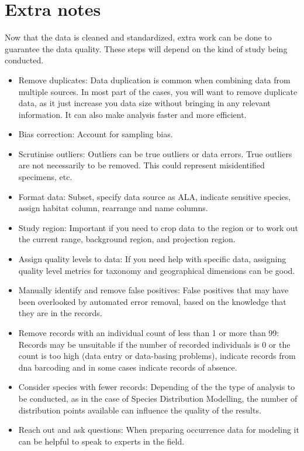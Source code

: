 \documentclass[
  letterpaper,
  DIV=11,
  numbers=noendperiod,
  oneside]{scrreprt}
\begin{document}
\hypertarget{extra-notes}{%
\section{Extra notes}\label{extra-notes}}

Now that the data is cleaned and standardized, extra work can be done to
guarantee the data quality. These steps will depend on the kind of study
being conducted.

\begin{itemize}
\item
  Remove duplicates: Data duplication is common when combining data from
  multiple sources. In most part of the cases, you will want to remove
  duplicate data, as it just increase you data size without bringing in
  any relevant information. It can also make analysis faster and more
  efficient.
\item
  Bias correction: Account for sampling bias.
\item
  Scrutinise outliers: Outliers can be true outliers or data errors.
  True outliers are not necessarily to be removed. This could represent
  misidentified specimens, etc.
\item
  Format data: Subset, specify data source as ALA, indicate sensitive
  species, assign habitat column, rearrange and name columns.
\item
  Study region: Important if you need to crop data to the region or to
  work out the current range, background region, and projection region.
\item
  Assign quality levels to data: If you need help with specific data,
  assigning quality level metrics for taxonomy and geographical
  dimensions can be good.
\item
  Manually identify and remove false positives: False positives that may
  have been overlooked by automated error removal, based on the
  knowledge that they are in the records.
\item
  Remove records with an individual count of less than 1 or more than
  99: Records may be unsuitable if the number of recorded individuals is
  0 or the count is too high (data entry or data-basing problems),
  indicate records from dna barcoding and in some cases indicate records
  of absence.
\item
  Consider species with fewer records: Depending of the the type of
  analysis to be conducted, as in the case of Species Distribution
  Modelling, the number of distribution points available can influence
  the quality of the results.
\item
  Reach out and ask questions: When preparing occurrence data for
  modeling it can be helpful to speak to experts in the field.
\end{itemize}
\end{document}
